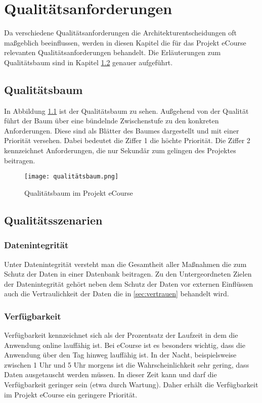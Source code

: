 \chapter{Qualitätsanforderungen}
Da verschiedene Qualitätsanforderungen die Architekturentscheidungen oft maßgeblich beeinflussen, werden in diesen Kapitel die für das Projekt eCourse relevanten Qualitätsanforderungen behandelt. Die Erläuterungen zum Qualitätsbaum sind in Kapitel \ref{sec:q2} genauer aufgeführt.

\section{Qualitätsbaum}
In Abbildung \ref{fib:baum} ist der Qualitätsbaum zu sehen. Außgehend von der Qualität führt der Baum über eine bündelnde Zwischenstufe zu den konkreten Anforderungen. Diese sind als Blätter des Baumes dargestellt und mit einer Priorität versehen. Dabei bedeutet die Ziffer 1 die höchte Priorität. Die Ziffer 2 kennzeichnet Anforderungen, die nur Sekundär zum gelingen des Projektes beitragen.
\begin{landscape}
\begin{figure}[H]
\centering
\texttt{[image: qualitätsbaum.png]}
\caption{Qualitätsbaum im Projekt eCourse}
\label{fib:baum}
\end{figure}
\end{landscape}

\section{Qualitätsszenarien}
\label{sec:q2}
\subsection{Datenintegrität}
Unter Datenintegrität versteht man die Gesamtheit aller Maßnahmen die zum Schutz der Daten in einer Datenbank beitragen. Zu den Untergeordneten Zielen der Datenintegrität gehört neben dem Schutz der Daten vor externen Einflüssen auch die Vertraulichkeit der Daten die in \ref{sec:vertrauen} behandelt wird.

\subsection{Verfügbarkeit}
Verfügbarkeit kennzeichnet sich als der Prozentsatz der Laufzeit in dem die Anwendung online lauffähig ist. Bei eCourse ist es besonders wichtig, dass die Anwendung über den Tag hinweg lauffähig ist. In der Nacht, beispielsweise zwischen 1 Uhr und 5 Uhr morgens ist die Wahrscheinlichkeit sehr gering, dass Daten ausgetauscht werden müssen. In dieser Zeit kann und darf die Verfügbarkeit geringer sein (etwa durch Wartung). Daher erhält die Verfügbarkeit im Projekt eCourse ein geringere Priorität.

